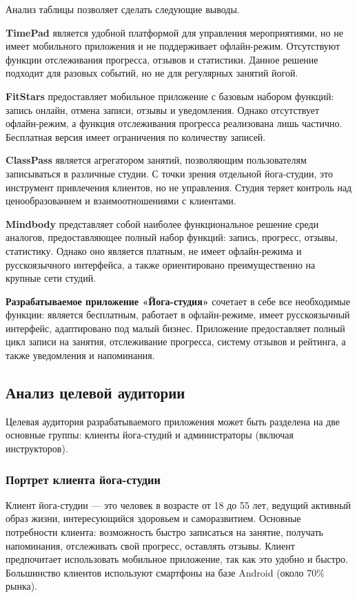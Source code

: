 \noindent Анализ таблицы позволяет сделать следующие выводы.

\textbf{TimePad} является удобной платформой для управления мероприятиями, но не имеет мобильного приложения и не поддерживает офлайн-режим. Отсутствуют функции отслеживания прогресса, отзывов и статистики. Данное решение подходит для разовых событий, но не для регулярных занятий йогой.

\textbf{FitStars} предоставляет мобильное приложение с базовым набором функций: запись онлайн, отмена записи, отзывы и уведомления. Однако отсутствует офлайн-режим, а функция отслеживания прогресса реализована лишь частично. Бесплатная версия имеет ограничения по количеству записей.

\textbf{ClassPass} является агрегатором занятий, позволяющим пользователям записываться в различные студии. С точки зрения отдельной йога-студии, это инструмент привлечения клиентов, но не управления. Студия теряет контроль над ценообразованием и взаимоотношениями с клиентами.

\textbf{Mindbody} представляет собой наиболее функциональное решение среди аналогов, предоставляющее полный набор функций: запись, прогресс, отзывы, статистику. Однако оно является платным, не имеет офлайн-режима и русскоязычного интерфейса, а также ориентировано преимущественно на крупные сети студий.

\textbf{Разрабатываемое приложение «Йога-студия»} сочетает в себе все необходимые функции: является бесплатным, работает в офлайн-режиме, имеет русскоязычный интерфейс, адаптировано под малый бизнес. Приложение предоставляет полный цикл записи на занятия, отслеживание прогресса, систему отзывов и рейтинга, а также уведомления и напоминания.

\subsection{Анализ целевой аудитории}

Целевая аудитория разрабатываемого приложения может быть разделена на две основные группы: клиенты йога-студий и администраторы (включая инструкторов).

\subsubsection{Портрет клиента йога-студии}

Клиент йога-студии — это человек в возрасте от 18 до 55 лет, ведущий активный образ жизни, интересующийся здоровьем и саморазвитием. Основные потребности клиента: возможность быстро записаться на занятие, получать напоминания, отслеживать свой прогресс, оставлять отзывы. Клиент предпочитает использовать мобильное приложение, так как это удобно и быстро. Большинство клиентов используют смартфоны на базе Android (около 70\% рынка).

